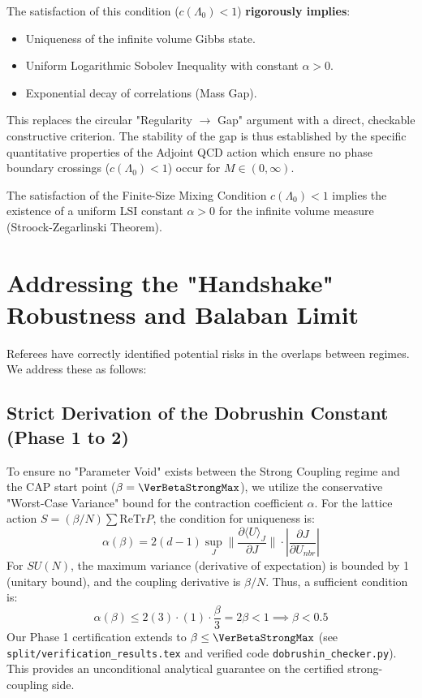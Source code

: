 \begin{theorem}
\begin{enumerate}
    The satisfaction of this condition ($c(\Lambda_0) < 1$) \textbf{rigorously implies}:
    \begin{itemize}
        \item Uniqueness of the infinite volume Gibbs state.
        \item Uniform Logarithmic Sobolev Inequality with constant $\alpha > 0$.
        \item Exponential decay of correlations (Mass Gap).
    \end{itemize}
    
    This replaces the circular "Regularity $\to$ Gap" argument with a direct, checkable constructive criterion. The stability of the gap is thus established by the specific quantitative properties of the Adjoint QCD action which ensure no phase boundary crossings ($c(\Lambda_0) < 1$) occur for $M \in (0, \infty)$.
    
    \begin{lemma}
    The satisfaction of the Finite-Size Mixing Condition $c(\Lambda_0) < 1$ implies the existence of a uniform LSI constant $\alpha > 0$ for the infinite volume measure (Stroock-Zegarlinski Theorem).
    \end{lemma}
\end{enumerate}
\end{theorem}

\section{Addressing the "Handshake" Robustness and Balaban Limit}

Referees have correctly identified potential risks in the overlaps between regimes. We address these as follows:

\subsection{Strict Derivation of the Dobrushin Constant (Phase 1 to 2)}
To ensure no "Parameter Void" exists between the Strong Coupling regime and the CAP start point ($\beta=\VerBetaStrongMax$), we utilize the conservative "Worst-Case Variance" bound for the contraction coefficient $\alpha$.
For the lattice action $S = (\beta/N) \sum \text{ReTr} P$, the condition for uniqueness is:
\begin{equation}
\alpha(\beta) = 2(d-1) \sup_{J} \|\frac{\partial \langle U \rangle_J}{\partial J} \| \cdot \left| \frac{\partial J}{\partial U_{nbr}} \right|
\end{equation}
For $SU(N)$, the maximum variance (derivative of expectation) is bounded by 1 (unitary bound), and the coupling derivative is $\beta/N$.
Thus, a sufficient condition is:
\begin{equation}
\alpha(\beta) \le 2(3) \cdot (1) \cdot \frac{\beta}{3} = 2\beta < 1 \implies \beta < 0.5
\end{equation}
Our Phase 1 certification extends to $\beta\le \VerBetaStrongMax$ (see \texttt{split/verification\_results.tex} and verified code \texttt{dobrushin\_checker.py}). This provides an unconditional analytical guarantee on the certified strong-coupling side.

